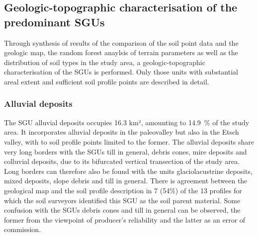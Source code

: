 \documentclass[preprint,12pt,authoryear]{elsarticle}
\begin{document}
\subsection{Geologic-topographic characterisation of the predominant SGUs}
Through synthesis of results of the comparison of the soil point data and the geologic map, the random forest anaylsis of terrain parameters as well as the distribution of soil types in the study area, a geologic-topographic characterisation of the  SGUs is performed. Only those units with substantial areal extent and sufficient soil profile points are described in detail.
\subsubsection{Alluvial deposits}
The SGU alluvial deposits occupies 16.3 km², amounting to 14.9~\% of the study area. It incorporates alluvial deposits in the paleovalley but also in the Etsch valley, with to soil profile points limited to the former. The alluvial deposits share very long borders with the SGUs till in general, debris cones, mire deposits and colluvial deposits, due to its bifurcated vertical transection of the study area. Long borders can therefore also be found with the units glaciolacustrine deposits, mixed deposits, slope debris and till in general. There is agreement between the geological map and the soil profile description in 7 (54\%) of the 13 profiles for which the soil surveyors identified this SGU as the soil parent material. Some confusion with the SGUs debris cones and till in general can be observed, the former from the viewpoint of producer's reliability and the latter as an error of commission. 
\end{document}
